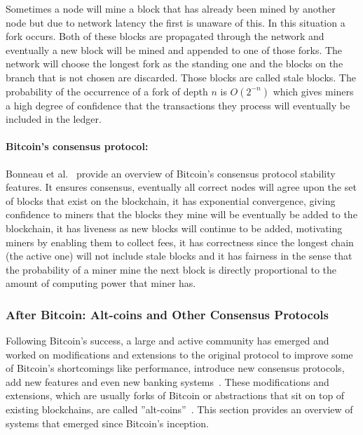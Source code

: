 Sometimes a node will mine a block that has already been mined by another node but due to network latency the first is unaware of this. In this situation a fork occurs. Both of these blocks are propagated through the network and eventually a new block will be mined and appended to one of those forks. The network will choose the longest fork as the standing one and the blocks on the branch that is not chosen are discarded. Those blocks are called stale blocks. The probability of the occurrence of a fork of depth $n$ is $O(2^{-n})$ which gives miners a high degree of confidence that the transactions they process will eventually be included in the ledger.

\paragraph{Bitcoin's consensus protocol:} Bonneau et al.~\cite{Bonneau:2015ema} provide an overview of Bitcoin's consensus protocol stability features. It ensures consensus, eventually all correct nodes will agree upon the set of blocks that exist on the blockchain, it has exponential convergence, giving confidence to miners that the blocks they mine will be eventually be added to the blockchain, it has liveness as new blocks will continue to be added, motivating miners by enabling them to collect fees, it has correctness since the longest chain (the active one) will not include stale blocks and it has fairness in the sense that the probability of a miner mine the next block is directly proportional to the amount of computing power that miner has.


\subsubsection{After Bitcoin: Alt-coins and Other Consensus Protocols}
\label{rel:alt-coins}

Following Bitcoin's success, a large and active community has emerged and worked on modifications and extensions to the original protocol to improve some of Bitcoin's shortcomings like performance, introduce new consensus protocols, add new features and even new banking systems~\cite{Danezis:2015ha}. These modifications and extensions, which are usually forks of Bitcoin or abstractions that sit on top of existing blockchains, are called ''alt-coins''~\cite{Bonneau:2015ema}. This section provides an overview of systems that emerged since Bitcoin's inception.

